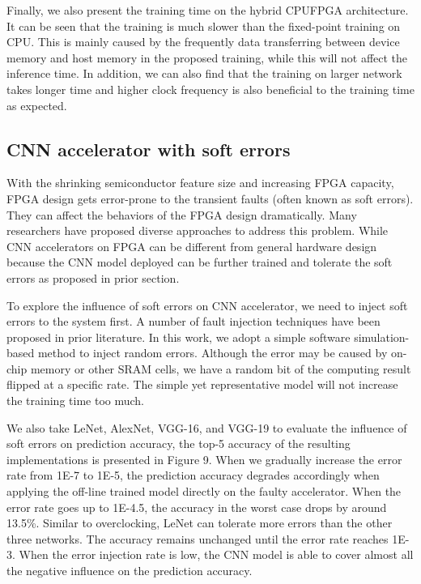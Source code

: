   Finally, we also present the training time on the hybrid CPUFPGA architecture. 
It can be seen that the training is much slower than the fixed-point training on CPU. 
This is mainly caused by the frequently data transferring between device memory and host 
memory in the proposed training, while this will not affect the inference time. In addition, 
we can also find that the training on larger network takes longer time and higher clock frequency 
is also beneficial to the training time as expected. 

\subsection{CNN accelerator with soft errors}
  With the shrinking semiconductor feature size and increasing FPGA capacity, 
FPGA design gets error-prone to the transient faults (often known as soft errors). 
They can affect the behaviors of the FPGA design dramatically. Many researchers \cite{Mansour_20,Karim_21,Nidhin_22,Subasi_23,ROSCH_24} 
have proposed diverse approaches to address this problem. While CNN accelerators on FPGA can be different 
from general hardware design because the CNN model deployed can be further trained and tolerate the 
soft errors as proposed in prior section\cite{Tu2018RANA_1}.

  To explore the influence of soft errors on CNN accelerator, we need to inject soft errors to the system first. 
A number of fault injection techniques have been proposed in prior literature. In this work, we adopt 
a simple software simulation- based method to inject random errors. Although the error may be caused by 
on-chip memory or other SRAM cells, we have a random bit of the computing result flipped at a specific rate. 
The simple yet representative model will not increase the training time too much.

  We also take LeNet, AlexNet, VGG-16, and VGG-19 to evaluate the influence of soft errors on prediction accuracy,
the top-5 accuracy of the resulting implementations is presented in Figure 9. When we gradually 
increase the error rate from 1E-7 to 1E-5, the prediction accuracy degrades accordingly when applying the off-line 
trained model directly on the faulty accelerator. When the error rate goes up to 1E-4.5, 
the accuracy in the worst case drops by around 13.5\%. Similar to overclocking, LeNet can tolerate 
more errors than the other three networks. The accuracy remains unchanged until the error rate reaches 1E-3. 
When the error injection rate is low, the CNN model is able to cover almost all the negative influence 
on the prediction accuracy.

